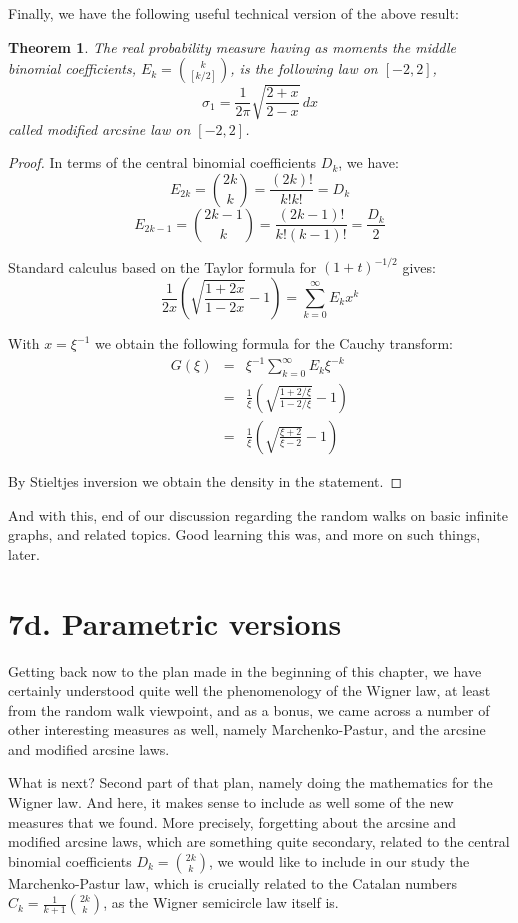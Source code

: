 \documentclass[12pt]{amsbook}
\newtheorem{theorem}{Theorem}[chapter]
\begin{document}
Finally, we have the following useful technical version of the above result:


\begin{theorem}
The real probability measure having as moments the middle binomial coefficients, $E_k=\binom{k}{[k/2]}$, is the following law on $[-2,2]$,
$$\sigma_1=\frac{1}{2\pi}\sqrt{\frac{2+x}{2-x}}\,dx$$
called modified arcsine law on $[-2,2]$.
\end{theorem}

\begin{proof}
In terms of the central binomial coefficients $D_k$, we have:
$$E_{2k}=\binom{2k}{k}=\frac{(2k)!}{k!k!}=D_k$$
$$E_{2k-1}=\binom{2k-1}{k}=\frac{(2k-1)!}{k!(k-1)!}=\frac{D_k}{2}$$

Standard calculus based on the Taylor formula for $(1+t)^{-1/2}$ gives:
$$\frac{1}{2x}\left(\sqrt{\frac{1+2x}{1-2x}}-1\right)=\sum_{k=0}^\infty E_kx^k$$

With $x=\xi^{-1}$ we obtain the following formula for the Cauchy transform:
\begin{eqnarray*}
G(\xi)
&=&\xi^{-1}\sum_{k=0}^\infty E_k\xi^{-k}\\
&=&\frac{1}{\xi}\left(\sqrt{\frac{1+2/\xi}{1-2/\xi}}-1\right)\\
&=&\frac{1}{\xi}\left(\sqrt{\frac{\xi+2}{\xi-2}}-1\right)
\end{eqnarray*}

By Stieltjes inversion we obtain the density in the statement.
\end{proof}

And with this, end of our discussion regarding the random walks on basic infinite graphs, and related topics. Good learning this was, and more on such things, later.

\section*{7d. Parametric versions}

Getting back now to the plan made in the beginning of this chapter, we have certainly understood quite well the phenomenology of the Wigner law, at least from the random walk viewpoint, and as a bonus, we came across a number of other interesting measures as well, namely Marchenko-Pastur, and the arcsine and modified arcsine laws.

\bigskip

What is next? Second part of that plan, namely doing the mathematics for the Wigner law. And here, it makes sense to include as well some of the new measures that we found. More precisely, forgetting about the arcsine and modified arcsine laws, which are something quite secondary, related to the central binomial coefficients $D_k=\binom{2k}{k}$, we would like to include in our study the Marchenko-Pastur law, which is crucially related to the Catalan numbers $C_k=\frac{1}{k+1}\binom{2k}{k}$, as the Wigner semicircle law itself is.
\end{document}
